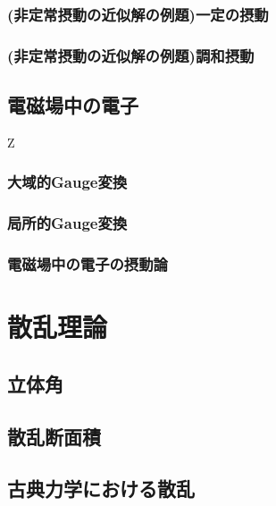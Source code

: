 \documentclass{report}
\begin{document}
      \subsection{(非定常摂動の近似解の例題)一定の摂動}
        
      \subsection{(非定常摂動の近似解の例題)調和摂動}
        
    \section{電磁場中の電子}Z
      
      \subsection{大域的Gauge変換}
        
      \subsection{局所的Gauge変換}
        
      \subsection{電磁場中の電子の摂動論}
        
  \chapter{散乱理論}
    \section{立体角}
      
    \section{散乱断面積}
      
    \section{古典力学における散乱}
      
\end{document}
